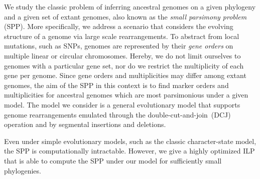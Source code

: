     We study the classic problem of inferring ancestral genomes on a given phylogeny and a given set of extant genomes, also known as the \emph{small parsimony problem} (SPP).
    More specifically, we address a scenario that considers the evolving structure of a genome via large scale rearrangements.
    To abstract from local mutations, such as SNPs, genomes are represented by their \emph{gene orders} on multiple linear or circular chromosomes.
    Hereby, we do not limit ourselves to genomes with a particular gene set, nor do we restrict the multiplicity of each gene per genome.
    Since gene orders and multiplicities may differ among extant genomes, the aim of the SPP in this context is to find marker orders and multiplicities for ancestral genomes which are most parsimonious under a given model.
    The model we consider is a general evolutionary model that supports genome rearrangements emulated through the double-cut-and-join~(DCJ) operation and by segmental insertions and deletions.
    
Even under simple evolutionary models, such as the classic character-state model, the SPP is computationally intractable.
However, we give a highly optimized ILP that is able to compute the SPP under our model for sufficiently small phylogenies.